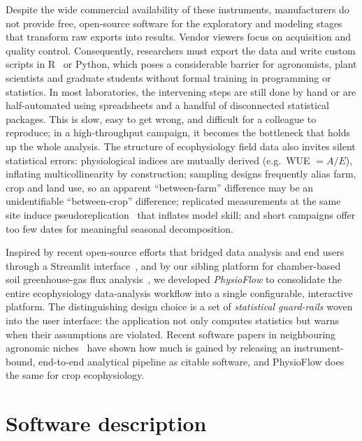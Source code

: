 \documentclass[preprint,12pt,a4paper]{elsarticle}
\begin{document}
Despite the wide commercial availability of these instruments, manufacturers do not provide free, open-source software for the exploratory and modeling stages that transform raw exports into results. Vendor viewers focus on acquisition and quality control. Consequently, researchers must export the data and write custom scripts in R~\cite{Rcore} or Python, which poses a considerable barrier for agronomists, plant scientists and graduate students without formal training in programming or statistics. In most laboratories, the intervening steps are still done by hand or are half-automated using spreadsheets and a handful of disconnected statistical packages. This is slow, easy to get wrong, and difficult for a colleague to reproduce; in a high-throughput campaign, it becomes the bottleneck that holds up the whole analysis. The structure of ecophysiology field data also invites silent statistical errors: physiological indices are mutually derived (e.g.\ WUE $= A/E$), inflating multicollinearity by construction; sampling designs frequently alias farm, crop and land use, so an apparent ``between-farm'' difference may be an unidentifiable ``between-crop'' difference; replicated measurements at the same site induce pseudoreplication~\cite{Hurlbert1984} that inflates model skill; and short campaigns offer too few dates for meaningful seasonal decomposition.

Inspired by recent open-source efforts that bridged data analysis and end users through a Streamlit interface~\cite{Streamlit}, and by our sibling platform for chamber-based soil greenhouse-gas flux analysis~\cite{DaSilva2026Goias}, we developed \emph{PhysioFlow} to consolidate the entire ecophysiology data-analysis workflow into a single configurable, interactive platform. The distinguishing design choice is a set of \emph{statistical guard-rails} woven into the user interface: the application not only computes statistics but warns when their assumptions are violated. Recent software papers in neighbouring agronomic niches~\cite{Magnani2026apsimNGpy,Crecco2026prismatools} have shown how much is gained by releasing an instrument-bound, end-to-end analytical pipeline as citable software, and PhysioFlow does the same for crop ecophysiology.

\section{Software description}\label{sec:software}
\end{document}
